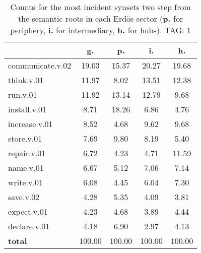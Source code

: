 \begin{table}[h!]
\begin{center}
\begin{tabular}{| l || c | c | c | c |}\hline
 & {\bf g.} & {\bf p.} & {\bf i.} & {\bf h.} \\\hline\hline
communicate.v.02 & 19.03  & 15.37  & 20.27  & 19.68 \\\hline
think.v.01 & 11.97  & 8.02  & 13.51  & 12.38 \\\hline
run.v.01 & 11.92  & 13.14  & 12.79  & 9.68 \\\hline
install.v.01 & 8.71  & 18.26  & 6.86  & 4.76 \\\hline
increase.v.01 & 8.52  & 4.68  & 9.62  & 9.68 \\\hline
store.v.01 & 7.69  & 9.80  & 8.19  & 5.40 \\\hline
repair.v.01 & 6.72  & 4.23  & 4.71  & 11.59 \\\hline
name.v.01 & 6.67  & 5.12  & 7.06  & 7.14 \\\hline
write.v.01 & 6.08  & 4.45  & 6.04  & 7.30 \\\hline
save.v.02 & 4.28  & 5.35  & 4.09  & 3.81 \\\hline
expect.v.01 & 4.23  & 4.68  & 3.89  & 4.44 \\\hline
declare.v.01 & 4.18  & 6.90  & 2.97  & 4.13 \\\hline\hline
{{\bf total}} & 100.00  & 100.00  & 100.00  & 100.00 \\\hline
\end{tabular}
\caption{Counts for the most incident synsets two step from the semantic roots in each Erd\"os sector ({\bf p.} for periphery, {\bf i.} for intermediary, {\bf h.} for hubs). TAG: 1}
\end{center}
\end{table}